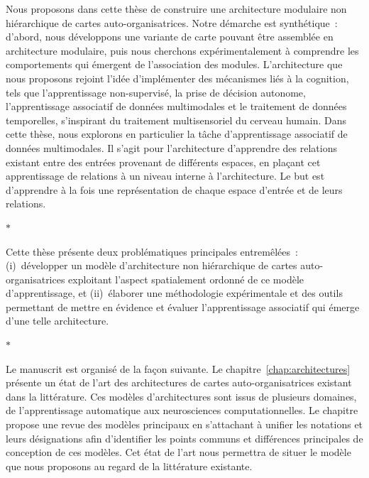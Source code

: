 Nous proposons dans cette thèse de construire une architecture modulaire non hiérarchique de cartes auto-organisatrices.
Notre démarche est synthétique~: d'abord, nous développons une variante de carte pouvant être assemblée en architecture modulaire, puis nous cherchons expérimentalement à comprendre les comportements qui émergent de l'association des modules.
L'architecture que nous proposons rejoint l'idée d'implémenter des mécanismes liés à la cognition, tels que l'apprentissage non-supervisé, la prise de décision autonome, l'apprentissage associatif de données multimodales et le traitement de données temporelles, s'inspirant du traitement multisensoriel du cerveau humain. 
Dans cette thèse, nous explorons en particulier la tâche d'apprentissage associatif de données multimodales.
Il s'agit pour l'architecture d'apprendre des relations existant entre des entrées provenant de différents espaces, en plaçant cet apprentissage de relations à un niveau interne à l'architecture. Le but est d'apprendre à la fois une représentation de chaque espace d'entrée et de leurs relations.

\begin{center}
  $\ast$
\end{center}

Cette thèse présente deux problématiques principales entremêlées~: (i)~développer un modèle d'architecture non hiérarchique de cartes auto-organisatrices exploitant l'aspect spatialement ordonné de ce modèle d'apprentissage, et (ii)~élaborer une méthodologie expérimentale et des outils permettant de mettre en évidence et évaluer l'apprentissage associatif qui émerge d'une telle architecture.

\begin{center}
  $\ast$
\end{center}

Le manuscrit est organisé de la façon suivante.
Le chapitre~\ref{chap:architectures} présente un état de l'art des architectures de cartes auto-organisatrices existant dans la littérature. Ces modèles d'architectures sont issus de plusieurs domaines, de l'apprentissage automatique aux neurosciences computationnelles.
Le chapitre propose une revue des modèles principaux en s'attachant à unifier les notations et leurs désignations afin d'identifier les points communs et différences principales de conception de ces modèles.
Cet état de l'art nous permettra de situer le modèle que nous proposons au regard de la littérature existante.

